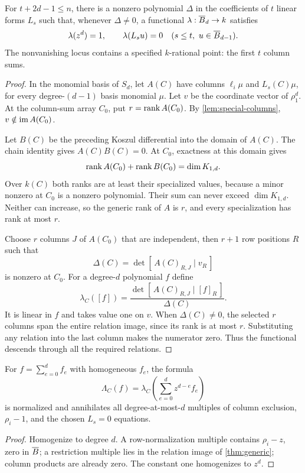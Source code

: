 \begin{theorem}\label{thm:generic}
For $t+2d-1\le n$, there is a nonzero polynomial $\Delta$ in the coefficients of $t$ linear forms $L_s$ such that, whenever $\Delta\ne0$, a functional $\lambda:\overline B_d\to k$ satisfies
\[
 \lambda(z^d)=1,\qquad
 \lambda(L_su)=0\quad(s\le t,\ u\in\overline B_{d-1}).
\]
The nonvanishing locus contains a specified $k$-rational point: the first $t$ column sums.
\end{theorem}
\begin{proof}
In the monomial basis of $S_d$, let $A(C)$ have columns $\ell_i\mu$ and $L_s(C)\mu$, for every degree-$(d-1)$ basis monomial $\mu$. Let $v$ be the coordinate vector of $\rho_1^d$. At the column-sum array $C_0$, put $r=\operatorname{rank} A(C_0)$. By \cref{lem:special-columns}, $v\notin\operatorname{im} A(C_0)$.

Let $B(C)$ be the preceding Koszul differential into the domain of $A(C)$. The chain identity gives $A(C)B(C)=0$. At $C_0$, exactness at this domain gives
\[
 \operatorname{rank} A(C_0)+\operatorname{rank} B(C_0)=\dim K_{1,d}.
\]
Over $k(C)$ both ranks are at least their specialized values, because a minor nonzero at $C_0$ is a nonzero polynomial. Their sum can never exceed $\dim K_{1,d}$. Neither can increase, so the generic rank of $A$ is $r$, and every specialization has rank at most $r$.

Choose $r$ columns $J$ of $A(C_0)$ that are independent, then $r+1$ row positions $R$ such that
\[
 \Delta(C)=\det[\,A(C)_{R,J}\mid v_R\,]
\]
is nonzero at $C_0$. For a degree-$d$ polynomial $f$ define
\begin{equation}\label{eq:detfunctional}
 \lambda_C([f])=
 \frac{\det[\,A(C)_{R,J}\mid [f]_R\,]}{\Delta(C)}.
\end{equation}
It is linear in $f$ and takes value one on $v$. When $\Delta(C)\ne0$, the selected $r$ columns span the entire relation image, since its rank is at most $r$. Substituting any relation into the last column makes the numerator zero. Thus the functional descends through all the required relations.
\end{proof}

\begin{corollary}\label{cor:affinegeneric}
For $f=\sum_{e=0}^df_e$ with homogeneous $f_e$, the formula
\[
 \Lambda_C(f)=\lambda_C\left(\sum_{e=0}^dz^{d-e}f_e\right)
\]
is normalized and annihilates all degree-at-most-$d$ multiples of column exclusion, $\rho_i-1$, and the chosen $L_s=0$ equations.
\end{corollary}
\begin{proof}
Homogenize to degree $d$. A row-normalization multiple contains $\rho_i-z$, zero in $\overline B$; a restriction multiple lies in the relation image of \cref{thm:generic}; column products are already zero. The constant one homogenizes to $z^d$.
\end{proof}

